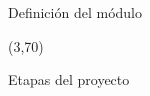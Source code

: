 \documentclass[aspectratio=169]{beamer}
\begin{document}
\begin{frame}[fragile,t]
\begin{textblock}{22}
\begin{tcolorbox}[size=small,width=\textwidth,colback={gray!50},title={}]
        \begin{center}
        \scriptsize Definición del módulo
        \end{center}
        \end{tcolorbox}
    \end{textblock}
    \begin{textblock}{16}(3,70)
        \begin{tcolorbox}[size=small,width=\textwidth,colback={gray!50},title={}]
        \begin{center}
        \scriptsize Etapas del proyecto
        \end{center}
        \end{tcolorbox}
    \end{textblock}
\end{frame}
    
\end{document}
